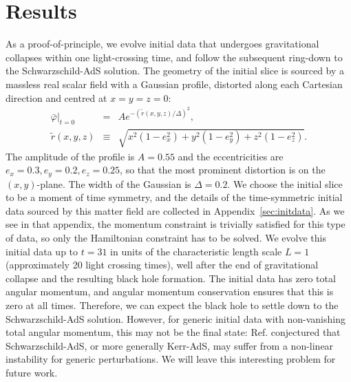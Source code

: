 \documentclass[a4paper,11pt]{article}
\numberwithin{equation}{section}
\begin{document}

\section{Results}\label{sec:results}

As a proof-of-principle, we evolve initial data that undergoes gravitational collapses within one light-crossing time, and follow the subsequent ring-down to the Schwarzschild-AdS solution.
The geometry of the initial slice is sourced by a massless real scalar field with a Gaussian profile, distorted along each Cartesian direction and centred at $x=y=z=0$:
\begin{eqnarray}
\label{eq:scaGaupro}
\bar{\varphi}|_{t=0}&=&A e^{-(\tilde{r}(x,y,z)/\Delta)^2},\\
\tilde{r}(x,y,z)&\equiv&\sqrt{ x^2(1-e_x^2)+ y^2(1-e_y^2)+ z^2(1-e_z^2)}. \nonumber
\end{eqnarray}
The amplitude of the profile is $A=0.55$ and  the eccentricities are $e_x=0.3, e_y=0.2, e_z=0.25$, so that the most prominent distortion is on the $(x,y)$-plane. The width of the Gaussian is $\Delta=0.2$. 
We choose the initial slice to be a moment of time symmetry, and the details of the time-symmetric initial data sourced by this matter field are collected in Appendix~\ref{sec:initdata}. 
As we see in that appendix, the momentum constraint is trivially satisfied for this type of data, so only the Hamiltonian constraint has to be solved. We evolve this initial data up to $t=31$ in units of the characteristic length scale $L=1$ (approximately 20 light crossing times), well after the end of gravitational collapse and the resulting black hole formation. 
The initial data has zero total angular momentum, 
and angular momentum conservation \cite{Fischetti:2012rd} ensures that this is zero at all times. 
Therefore, we can expect the black hole to settle down to the Schwarzschild-AdS solution. However, for generic initial data with non-vanishing total angular momentum, this may not be the final state: Ref. \cite{Holzegel:2011uu} conjectured that Schwarzschild-AdS, or more generally Kerr-AdS, may suffer from a non-linear instability for generic perturbations.
We will leave this interesting problem for future work.
\end{document}
